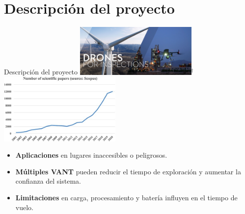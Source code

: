\documentclass[
  24pt, %
  aspectratio=169, %
]{beamer}
\begin{document}
\section{Descripción del proyecto}
\begin{frame}{Descripción del proyecto}
  \bigskip %
  \centering
  \includegraphics[width=0.45\textwidth,height=0.35\textheight]{DJI_B1}$^\dag$
  \hfil
  \includegraphics[width=0.45\textwidth,height=0.35\textheight]{survey_chart.jpg}\footnotemark
  \vspace{2pt}\\
  
  \begin{itemize}
  \item \textbf{Aplicaciones} en lugares inaccesibles o peligrosos.
  \item \textbf{Múltiples VANT} pueden reducir el tiempo de exploración y aumentar la confianza del sistema.
  \item \textbf{Limitaciones} en carga, procesamiento y batería influyen en el tiempo de vuelo.
  \end{itemize}

\end{frame}
\end{document}
